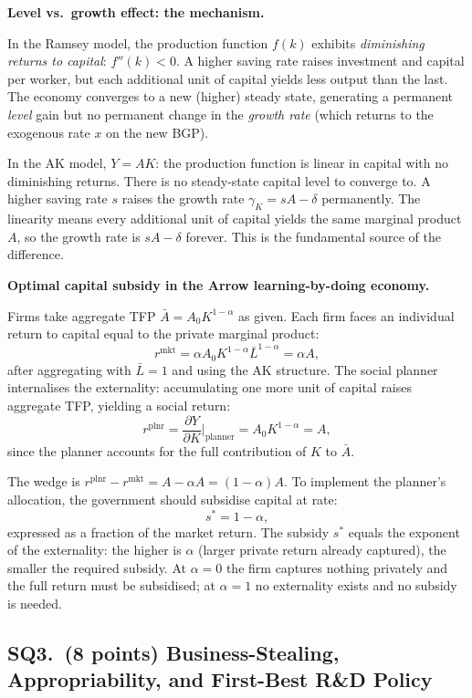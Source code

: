 \documentclass[a4paper,11pt]{article}
\begin{document}
\begin{answerbox}
\textbf{Level vs.\ growth effect: the mechanism.}

In the Ramsey model, the production function $f(k)$ exhibits \emph{diminishing returns to capital}: $f''(k) < 0$.  A higher saving rate raises investment and capital per worker, but each additional unit of capital yields less output than the last.  The economy converges to a new (higher) steady state, generating a permanent \emph{level} gain but no permanent change in the \emph{growth rate} (which returns to the exogenous rate $x$ on the new BGP).

In the AK model, $Y = AK$: the production function is linear in capital with no diminishing returns.  There is no steady-state capital level to converge to.  A higher saving rate $s$ raises the growth rate $\gamma_K = sA - \delta$ permanently.  The linearity means every additional unit of capital yields the same marginal product $A$, so the growth rate is $sA - \delta$ forever.  This is the fundamental source of the difference.

\textbf{Optimal capital subsidy in the Arrow learning-by-doing economy.}

Firms take aggregate TFP $\bar{A} = A_0 K^{1-\alpha}$ as given.  Each firm faces an individual return to capital equal to the private marginal product:
\[
    r^{\mathrm{mkt}} = \alpha A_0 K^{1-\alpha} \bar{L}^{1-\alpha} = \alpha A,
\]
after aggregating with $\bar{L}=1$ and using the AK structure.  The social planner internalises the externality: accumulating one more unit of capital raises aggregate TFP, yielding a social return:
\[
    r^{\mathrm{plnr}} = \frac{\partial Y}{\partial K}\bigg|_{\text{planner}} = A_0 K^{1-\alpha} = A,
\]
since the planner accounts for the full contribution of $K$ to $\bar{A}$.

The wedge is $r^{\mathrm{plnr}} - r^{\mathrm{mkt}} = A - \alpha A = (1-\alpha)A$.  To implement the planner's allocation, the government should subsidise capital at rate:
\[
    \boxed{s^* = 1 - \alpha,}
\]
expressed as a fraction of the market return.  The subsidy $s^*$ equals the exponent of the externality: the higher is $\alpha$ (larger private return already captured), the smaller the required subsidy.  At $\alpha = 0$ the firm captures nothing privately and the full return must be subsidised; at $\alpha = 1$ no externality exists and no subsidy is needed.
\end{answerbox}

\subsection*{SQ3.\ (8 points) Business-Stealing, Appropriability, and First-Best R\&D Policy}
\end{document}
